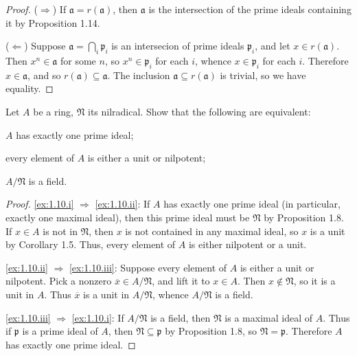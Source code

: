 \begin{proof}
($\Rightarrow$)
If $\mathfrak a = r(\mathfrak a)$, then $\mathfrak a$ is the intersection of the prime ideals containing it by Proposition 1.14.

($\Leftarrow$)
Suppose $\mathfrak a = \bigcap_i \mathfrak p_i$ is an intersecion of prime ideals $\mathfrak p_i$, and let $x \in r(\mathfrak a)$.
Then $x^n \in \mathfrak a$ for some $n$, so $x^n \in \mathfrak p_i$ for each $i$, whence $x \in \mathfrak p_i$ for each $i$.
Therefore $x \in \mathfrak a$, and so $r(\mathfrak a) \subseteq \mathfrak a$.
The inclusion $\mathfrak a \subseteq r(\mathfrak a)$ is trivial, so we have equality.
\end{proof}







\begin{exercise}
\label{ex:1.10}
Let $A$ be a ring, $\mathfrak N$ its nilradical.
Show that the following are equivalent:
\begin{rlist}
\item
\label{ex:1.10.i}
$A$ has exactly one prime ideal;
\item
\label{ex:1.10.ii}
every element of $A$ is either a unit or nilpotent;
\item
\label{ex:1.10.iii}
$A/\mathfrak N$ is a field.
\end{rlist}
\end{exercise}

\begin{proof}
\ref{ex:1.10.i} $\Rightarrow$ \ref{ex:1.10.ii}:
If $A$ has exactly one prime ideal (in particular, exactly one maximal ideal), then this prime ideal must be $\mathfrak N$ by Proposition 1.8.
If $x\in A$ is not in $\mathfrak N$, then $x$ is not contained in any maximal ideal, so $x$ is a unit by Corollary 1.5.
Thus, every element of $A$ is either nilpotent or a unit.

\ref{ex:1.10.ii} $\Rightarrow$ \ref{ex:1.10.iii}:
Suppose every element of $A$ is either a unit or nilpotent.
Pick a nonzero $\overline x \in A/\mathfrak N$, and lift it to $x \in A$.
Then $x \notin \mathfrak N$, so it is a unit in $A$.
Thus $\overline x$ is a unit in $A/\mathfrak N$, whence $A/\mathfrak N$ is a field.

\ref{ex:1.10.iii} $\Rightarrow$ \ref{ex:1.10.i}:
If $A/\mathfrak N$ is a field, then $\mathfrak N$ is a maximal ideal of $A$.
Thus if $\mathfrak p$ is a prime ideal of $A$, then $\mathfrak N \subseteq \mathfrak p$ by Proposition 1.8, so $\mathfrak N = \mathfrak p$.
Therefore $A$ has exactly one prime ideal.
\end{proof}








